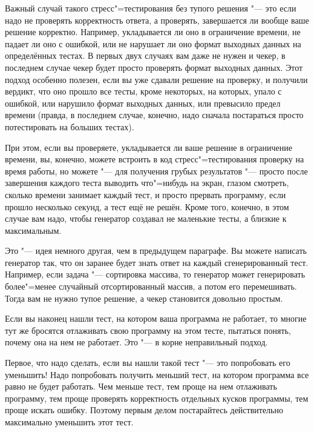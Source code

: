\documentclass[a4paper,10pt]{problems}
\begin{document}
Важный случай такого стресс"=тестирования без тупого решения "--- это если надо не проверять корректность ответа, а проверять, 
завершается ли вообще ваше решение корректно. 
Например, укладывается ли оно в ограничение времени, не падает ли оно с ошибкой, или не нарушает ли оно формат выходных данных на определённых тестах.
В первых двух случаях вам даже не нужен и чекер, в последнем случае чекер будет просто проверять формат выходных данных.
Этот подход особенно полезен, если вы уже сдавали решение на проверку, и получили вердикт, что оно прошло все тесты, кроме некоторых,
на которых, упало с ошибкой, или нарушило формат выходных данных, или превысило предел времени (правда, в последнем случае, конечно,
надо сначала постараться просто потестировать на больших тестах).

При этом, если вы проверяете, укладывается ли ваше решение в ограничение времени, вы, конечно, можете встроить в код стресс"=тестирования
проверку на время работы, но можете "--- для получения грубых результатов "--- просто после завершения каждого теста выводить что"=нибудь
на экран, глазом смотреть, сколько времени занимает каждый тест, и просто прервать программу, если прошло несколько секунд,
а тест ещё не решён. 
Кроме того, конечно, в этом случае вам надо, чтобы генератор создавал не маленькие тесты, а близкие к максимальным.

Это "--- идея немного другая, чем в предыдущем параграфе. 
Вы можете написать генератор так, что он заранее будет знать ответ на каждый сгенерированный тест. 
Например, если задача "--- сортировка массива, то генератор может генерировать более"=менее случайный отсортированный массив, 
а потом его перемешивать.
Тогда вам не нужно тупое решение, а чекер становится довольно простым.

Если вы наконец нашли тест, на котором ваша программа не работает, то многие тут же бросятся отлаживать свою программу на этом тесте, 
пытаться понять, почему она на нем не работает. Это "--- в корне неправильный подход.

Первое, что надо сделать, если вы нашли такой тест "--- это попробовать его уменьшить! 
Надо попробовать получить меньший тест, на котором программа все равно не будет работать. 
Чем меньше тест, тем проще на нем отлаживать программу, тем проще проверять корректность отдельных кусков программы, тем проще искать ошибку. 
Поэтому первым делом постарайтесь действительно максимально уменьшить этот тест.
\end{document}
